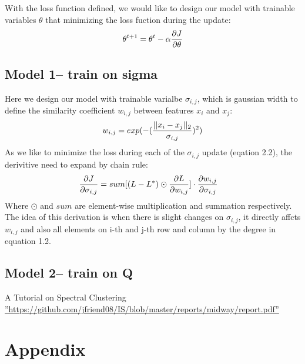 \documentclass[final]{siamltexmm}
\begin{document}
With the loss function defined, we would like to design our model with trainable variables $\theta$ that minimizing the loss fuction during the update:
\begin{equation}
\theta^{t+1} = \theta^{t} - \alpha {\partial J \over \partial \theta}
\end{equation}

\subsection{Model 1-- train on sigma}
Here we design our model with trainable varialbe $\sigma_{i,j}$, which is gaussian width to define the similarity coefficient $w_{i,j}$ between features $x_i$ and $x_j$:
\begin{equation}
w_{i,j} = exp(- ({|| x_i - x_j ||_2 \over \sigma_{i,j} })^2)
\end{equation}
As we like to minimize the loss during each of the $\sigma_{i,j}$ update (eqation 2.2), the derivitive need to expand by chain rule:
\begin{equation}
\begin{aligned}
{\partial J \over \partial \sigma_{i,j}} &= sum[(L - L^{\ast}) \odot {\partial L \over \partial w_{i,j}}] \cdot {\partial w_{i,j} \over \partial \sigma_{i,j}}
\end{aligned}
\end{equation}
Where $\odot$ and $sum$ are element-wise multiplication and summation respectively. The idea of this derivation is when there is slight changes on $\sigma_{i,j}$, it directly affcts $w_{i,j}$ and also all elements on i-th and j-th row and column by the degree in equation 1.2.

\subsection{Model 2-- train on Q}

\begin{thebibliography}{10}
 {\sc A Tutorial on Spectral Clustering}
 \hyperref[baseline]{''https://github.com/jfriend08/IS/blob/master/reports/midway/report.pdf''}
\end{thebibliography}

\section{Appendix}
\end{document}
